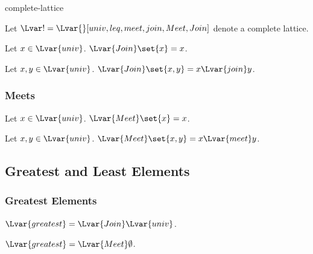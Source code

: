 \documentclass{stex}
\begin{document}
\begin{smodule}{complete-lattice}
  \begin{forthel}
    Let $\Lvar! = \Lvar{}[univ,leq,meet,join,Meet,Join]$ denote a complete lattice.
  \end{forthel}
    
  \begin{forthel}
    \begin{proposition*}
      Let $x \in \Lvar{univ}$.
      ${\Lvar{Join}} \set{x} = x$.
    \end{proposition*}
    
    \begin{proposition*}
      Let $x, y \in \Lvar{univ}$.
      ${\Lvar{Join}} \set{x,y} = x {\Lvar{join}} y$.
    \end{proposition*}
  \end{forthel}

  \subsubsection{Meets}

  \begin{forthel}
    \begin{proposition*}
      Let $x \in \Lvar{univ}$.
      ${\Lvar{Meet}} \set{x} = x$.
    \end{proposition*}
    
    \begin{proposition*}
      Let $x, y \in \Lvar{univ}$.
      ${\Lvar{Meet}} \set{x,y} = x {\Lvar{meet}} y$.
    \end{proposition*}
  \end{forthel}

  \subsection{Greatest and Least Elements}

  \subsubsection{Greatest Elements}

  \begin{forthel}
    \begin{definition*}
      ${\Lvar{greatest}} = {\Lvar{Join}} \Lvar{univ}$.
    \end{definition*}

    \begin{proposition*}
      ${\Lvar{greatest}} = {\Lvar{Meet}} \emptyset$.
    \end{proposition*}


\end{forthel}
\end{smodule}
\end{document}
